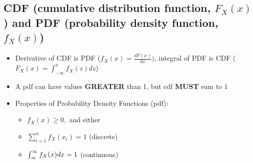 \documentclass[10pt, oneside]{article}
\begin{document}
\subsection{CDF (cumulative distribution function, $F_X(x)$) and PDF (probability density function, $f_X(x)$)}
\begin{itemize}
    \item Derivative of CDF is PDF ($f_X(x)=\frac{dF(x)}{dx})$, integral of PDF is CDF ($F_X(x)=\int^x_{-\infty} f_X(z)dz$)
    \item A pdf can have values \textbf{GREATER} than 1, but cdf \textbf{MUST} sum to $1$
    \item Properties of Probability Density Functions (pdf):
    \begin{itemize}
        \item $f_X(x)\geq 0,$ and either
        \item $\sum^n_{i=1}f_X(x_i)=1$ (discrete)
        \item $\int^{\infty}_{\-\infty} f_X(x)dx = 1$ (continuous)
    \end{itemize}
\end{itemize}
\end{document}
